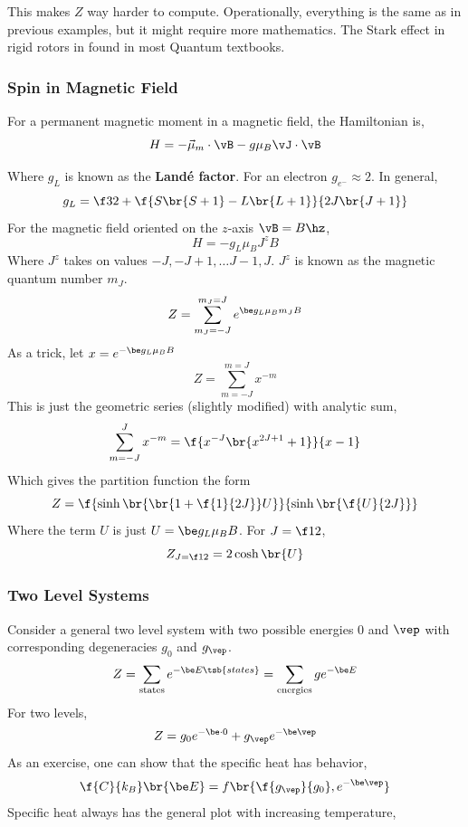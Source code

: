 \documentclass{article}
\begin{document}
This makes $Z$ way harder to compute. Operationally, everything is the same as in previous examples, but it might require more mathematics. The Stark effect in rigid rotors in found in most Quantum textbooks.

\subsubsection{Spin in Magnetic Field}

For a permanent magnetic moment in a magnetic field, the Hamiltonian is,
\[ H = - \vec{\mu}_m \cdot \vB - g \mu_B \vJ \cdot \vB \]{
Where $g_L$ is known as the \textbf{Landé factor}. For an electron $g_{e^-} \approx 2$. In general,
\[ g_L = \f32 + \f{S\br{S+1} - L\br{L+1}}{2J\br{J+1}} \]
For the magnetic field oriented on the $z$-axis $\vB = B \hz$,
\[ H = - g_L \mu_B J^{z} B \]
Where $J^z$ takes on values $-J, -J+1, \ldots J-1, J$. $J^z$ is known as the magnetic quantum number $m_J$.
\[ Z = \sum_{m_J = -J}^{m_J = J} e^{\be g_L \mu_B m_J B} \]
As a trick, let $x = e^{-\be g_L \mu_B B}$
\[ Z = \sum_{m = -J}^{m = J} x^{-m} \]
This is just the geometric series (slightly modified) with analytic sum,
\[ \sum_{m = -J}^{J} x^{-m} = \f{x^{-J}\br{x^{2J+1} + 1}}{x-1} \]
Which gives the partition function the form
\[ Z = \f{\sinh\br{\br{1 + \f{1}{2J}}U}}{\sinh\br{\f{U}{2J}}} \]
Where the term $U$ is just $U=\be g_L\mu_B B$. For $J = \f12$,
\[ Z_{J=\f12} = 2 \cosh\br{U} \]
\subsubsection{Two Level Systems}
Consider a general two level system with two possible energies $0$ and $\vep$ with corresponding degeneracies $g_0$ and $g_\vep$.
\[ Z = \sum_{\text{states}} e^{-\be E\tsb{states}} = \sum_{\text{energies}} g e^{-\be E} \]
For two levels,
\[ Z = g_0 e^{-\be \cdot 0} + g_\vep e^{-\be \vep} \]
As an exercise, one can show that the specific heat has behavior,
\[ \f{C}{k_B} \br{\be E} = f\br{\f{g_\vep}{g_0}, e^{-\be \vep}} \]
Specific heat always has the general plot with increasing temperature,

\begin{center}
\end{center}

}
\end{document}
